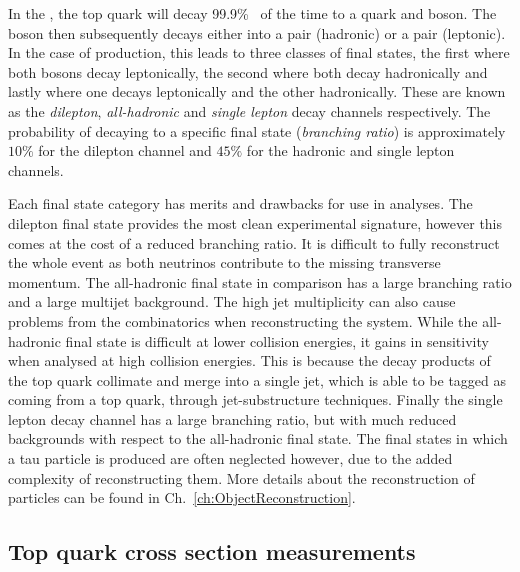 In the \SM{}, the top quark will decay 99.9\%~\cite{PDG} of the time to a \bquark{} quark and \Wboson{} boson.
The \Wboson{} boson then subsequently decays either into a \qpqbar{} pair (hadronic) or a \lepton{}\neutrinobar{} pair (leptonic).
In the case of \ttbar{} production, this leads to three classes of final states, the first where both \Wboson{} bosons decay leptonically, the second where both decay  hadronically and lastly where one decays leptonically and the other hadronically.
These are known as the \textit{dilepton}, \textit{all-hadronic} and \textit{single lepton} decay channels respectively.
The probability of decaying to a specific final state (\textit{branching ratio}) is approximately $10\%$ for the dilepton channel and $45\%$ for the hadronic and single lepton channels.

Each final state category has merits and drawbacks for use in analyses. 
The dilepton final state provides the most clean experimental signature, however this comes at the cost of a reduced branching ratio.
It is difficult to fully reconstruct the whole event as both neutrinos contribute to the missing transverse momentum.
The all-hadronic final state in comparison has a large branching ratio and a large multijet \QCD{} background.
The high jet multiplicity can also cause problems from the combinatorics when reconstructing the \ttbar{} system.
While the all-hadronic final state is difficult at lower collision energies, it gains in sensitivity when analysed at high collision energies.
This is because the decay products of the top quark collimate and merge into a single jet, which is able to be tagged as coming from a top quark, through jet-substructure techniques.
Finally the single lepton decay channel has a large branching ratio, but with much reduced backgrounds with respect to the all-hadronic final state. 
The final states in which a tau particle is produced are often neglected however, due to the added complexity of reconstructing them.
More details about the reconstruction of particles can be found in Ch.~\ref{ch:ObjectReconstruction}.

\subsection{Top quark cross section measurements} %
\label{sub:top_quark_cross_section_measurements}

